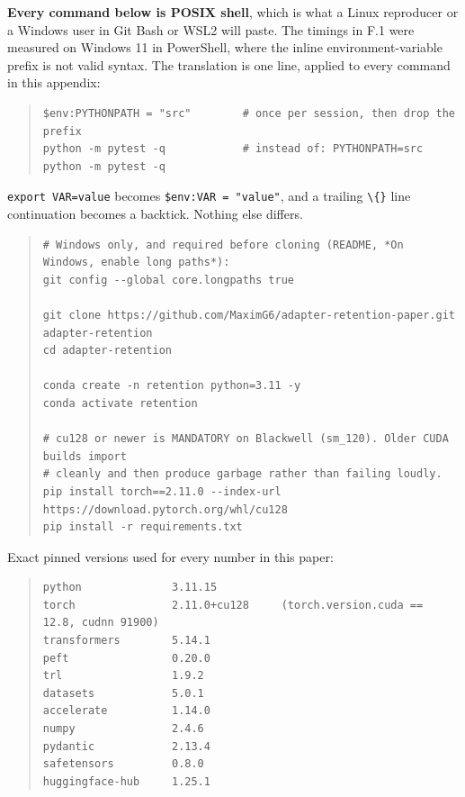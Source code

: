 \textbf{Every command below is POSIX shell}, which is what a Linux reproducer or a Windows user in Git Bash or WSL2 will paste. The timings in F.1 were measured on Windows 11 in PowerShell, where the inline environment-variable prefix is not valid syntax. The translation is one line, applied to every command in this appendix:

\begin{quote}\tiny\begin{verbatim}
$env:PYTHONPATH = "src"        # once per session, then drop the prefix
python -m pytest -q            # instead of: PYTHONPATH=src python -m pytest -q
\end{verbatim}\end{quote}

\texttt{export VAR=value} becomes \texttt{\$env:VAR = "value"}, and a trailing \texttt{\textbackslash\{\}} line continuation becomes a backtick. Nothing else differs.

\begin{quote}\tiny\begin{verbatim}
# Windows only, and required before cloning (README, *On Windows, enable long paths*):
git config --global core.longpaths true

git clone https://github.com/MaximG6/adapter-retention-paper.git adapter-retention
cd adapter-retention

conda create -n retention python=3.11 -y
conda activate retention

# cu128 or newer is MANDATORY on Blackwell (sm_120). Older CUDA builds import
# cleanly and then produce garbage rather than failing loudly.
pip install torch==2.11.0 --index-url https://download.pytorch.org/whl/cu128
pip install -r requirements.txt
\end{verbatim}\end{quote}

Exact pinned versions used for every number in this paper:

\begin{quote}\tiny\begin{verbatim}
python              3.11.15
torch               2.11.0+cu128     (torch.version.cuda == 12.8, cudnn 91900)
transformers        5.14.1
peft                0.20.0
trl                 1.9.2
datasets            5.0.1
accelerate          1.14.0
numpy               2.4.6
pydantic            2.13.4
safetensors         0.8.0
huggingface-hub     1.25.1
\end{verbatim}\end{quote}

